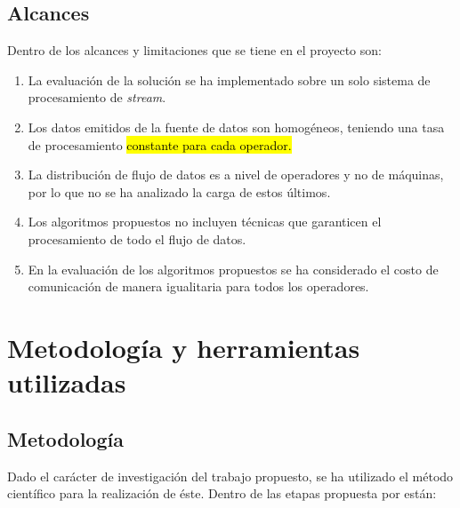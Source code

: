 \subsection{Alcances}
Dentro de los alcances y limitaciones que se tiene en el proyecto son:
\begin{enumerate}
	\item La evaluación de la solución se ha implementado sobre un solo sistema de procesamiento de \textit{stream}.
	\item Los datos emitidos de la fuente de datos son homogéneos, teniendo una tasa de procesamiento \hl{constante para cada operador.}
	\item La distribución de flujo de datos es a nivel de operadores y no de máquinas, por lo que no se ha analizado la carga de estos \'ultimos.
	\item Los algoritmos propuestos no incluyen t\'ecnicas que garanticen el procesamiento de todo el flujo de datos.
	\item En la evaluación de los algoritmos propuestos se ha considerado el costo de comunicación de manera igualitaria para todos los operadores.
\end{enumerate}


\section{Metodología y herramientas utilizadas}
\label{intro:metodologia}

\subsection{Metodología}
Dado el carácter de investigación del trabajo propuesto, se ha utilizado el método científico para la realización de éste. Dentro de las etapas propuesta por \citep{hernandez2010metodologia} están:

